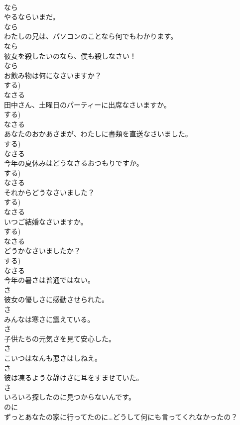 \documentclass[8pt]{extreport}
\begin{document}
\begin{CJK}{UTF8}{min}
\\	なら
\\	やるならいまだ。	
\\	なら
\\	わたしの兄は、パソコンのことなら何でもわかります。	
\\	なら
\\	彼女を殺したいのなら、僕も殺しなさい！	
\\	なら
\\	お飲み物は何になさいますか？	
\\	する)	
\\	なさる
\\	田中さん、土曜日のパーティーに出席なさいますか。	
\\	する)	
\\	なさる
\\	あなたのおかあさまが、わたしに書類を直送なさいました。	
\\	する)	
\\	なさる
\\	今年の夏休みはどうなさるおつもりですか。	
\\	する)	
\\	なさる
\\	それからどうなさいました？	
\\	する)	
\\	なさる
\\	いつご結婚なさいますか。	
\\	する)	
\\	なさる
\\	どうかなさいましたか？	
\\	する)	
\\	なさる
\\	今年の暑さは普通ではない。	
\\	さ
\\	彼女の優しさに感動させられた。	
\\	さ
\\	みんなは寒さに震えている。	
\\	さ
\\	子供たちの元気さを見て安心した。	
\\	さ
\\	こいつはなんも悪さはしねえ。	
\\	さ
\\	彼は凍るような静けさに耳をすませていた。	
\\	さ
\\	いろいろ探したのに見つからないんです。	
\\	のに
\\	ずっとあなたの家に行ってたのに…どうして何にも言ってくれなかったの？	

\end{CJK}
\end{document}
